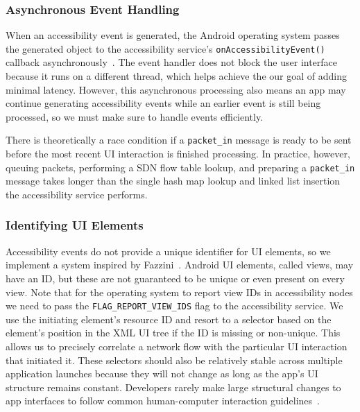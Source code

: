 \subsubsection{Asynchronous Event Handling}
\label{sec:asynchronous-event-handling}

When an accessibility event is generated, the Android operating system passes
the generated object to the accessibility service's
\texttt{onAccessibilityEvent()} callback
asynchronously~\cite{googledevelopers2020}. The event handler does not block the
user interface because it runs on a different thread, which helps achieve the
our goal of adding minimal latency. However, this asynchronous processing also
means an app may continue generating accessibility events while an earlier event
is still being processed, so we must make sure to handle events efficiently.

There is theoretically a race condition if a \texttt{packet\_in} message is
ready to be sent before the most recent UI interaction is finished processing.
In practice, however, queuing packets, performing a SDN flow table lookup, and
preparing a \texttt{packet\_in} message takes longer than the single hash map
lookup and linked list insertion the accessibility service performs.

\subsubsection{Identifying UI Elements}
\label{sec:identifying-ui-elements}

Accessibility events do not provide a unique identifier for UI elements, so we
implement a system inspired by Fazzini~\etal \cite{fazzini2017}. Android UI
elements, called views, may have an ID, but these are not guaranteed to be
unique or even present on every view. Note that for the operating system to
report view IDs in accessibility nodes we need to pass the
\texttt{FLAG\_REPORT\_VIEW\_IDS} flag to the accessibility service. We use the
initiating element's resource ID and resort to a selector based on the element's
position in the XML UI tree if the ID is missing or non-unique. This allows us
to precisely correlate a network flow with the particular UI interaction that
initiated it. These selectors should also be relatively stable across multiple
application launches because they will not change as long as the app's UI
structure remains constant. Developers rarely make large structural changes to
app interfaces to follow common human-computer interaction
guidelines~\cite{norman2013}.

